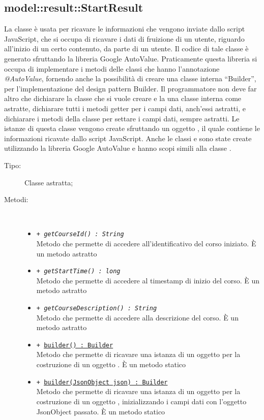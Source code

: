 \documentclass[../Tesi.tex]{subfiles}
\begin{document}
		\subsection{model::result::StartResult}
		La classe  è usata per ricavare le informazioni che vengono inviate dallo script JavaScript, che si occupa di ricavare i dati di fruizione di un utente, riguardo all'inizio di un certo contenuto, da parte di un utente. Il codice di tale classe è generato sfruttando la libreria Google AutoValue. Praticamente questa libreria si occupa di implementare i metodi delle classi che hanno l'annotazione \textit{@AutoValue}, fornendo anche la possibilità di creare una classe interna ``Builder'', per l'implementazione del design pattern Builder. Il programmatore non deve far altro che dichiarare la classe che si vuole creare e la una classe interna  come astratte, dichiarare tutti i metodi getter per i campi dati, anch'essi astratti, e dichiarare i metodi della classe  per settare i campi dati, sempre astratti. Le istanze di questa classe vengono create sfruttando un oggetto , il quale contiene le informazioni ricavate dallo script JavaScript. Anche le classi  e  sono state create utilizzando la libreria Google AutoValue e hanno scopi simili alla classe .
		\begin{description}
			\item[Tipo:] Classe astratta;
			
			\item[Metodi:] \
			\begin{itemize}
				\item \texttt{+ \textit{getCourseId() : String}}\\
				Metodo che permette di accedere all'identificativo del corso iniziato. È un metodo astratto

				\item \texttt{+ \textit{getStartTime() : long}}\\
				Metodo che permette di accedere al timestamp di inizio del corso. È un metodo astratto

				\item \texttt{+ \textit{getCourseDescription() : String}}\\
				Metodo che permette di accedere alla descrizione del corso. È un metodo astratto

				\item \texttt{+ \underline{builder() : Builder}}\\
				Metodo che permette di ricavare una istanza di un oggetto  per la costruzione di un oggetto . È un metodo statico

				\item \texttt{+ \underline{builder(JsonObject json) : Builder}}\\
				Metodo che permette di ricavare una istanza di un oggetto  per la costruzione di un oggetto , inizializzando i campi dati con l'oggetto JsonObject passato. È un metodo statico

			\end{itemize}
		\end{description}
\end{document}
